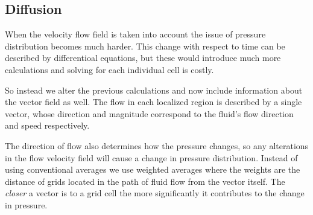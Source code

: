 \documentclass[15pt, titlepage]{article}
\begin{document}
\subsection{Diffusion}

When the velocity flow field is taken into account the issue of pressure distribution becomes much harder. This change with respect to time can be described by differentioal equations, but these would introduce much more calculations and solving for each individual cell is costly.

\begin{center}
\end{center}

So instead we alter the previous calculations and now include information about the vector field as well. The flow in each localized region is described by a single vector, whose direction and magnitude correspond to the fluid's flow direction and speed respectively.

\bigskip

The direction of flow also determines how the pressure changes, so any alterations in the flow velocity field will cause a change in pressure distribution.
Instead of using conventional averages we use weighted averages where the weights are the distance of grids located in the path of fluid flow from the vector itself.
The \textit{closer} a vector is to a grid cell the more significantly it contributes to the change in pressure. 
\end{document}
